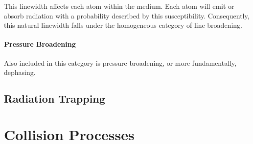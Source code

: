 This linewidth affects each atom within the medium. Each atom will emit or
absorb radiation with a probability described by this susceptibility.
Consequently, this natural linewidth falls under the homogeneous category of
line broadening.

\paragraph{Pressure Broadening}
Also included in this category is pressure broadening, or more fundamentally,
dephasing. 

\subsection{Radiation Trapping}

\section{Collision Processes}
